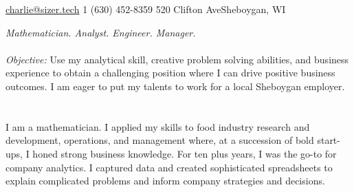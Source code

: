 \documentclass[10pt,letterpaper]{article} %
\begin{document}
 



\noindent\href{mailto:charlie@sizer.tech}{charlie@sizer.tech}\bull %
\textsmaller{+}1 (630) 452-8359\bull %
520 Clifton Ave\bull Sheboygan, WI%

\spacedhrule{0.9em}{-0.4em} %



\vspace{-1.3em} %

\begin{multicols}{2}  %
\noindent \textit{Mathematician. Analyst. Engineer. Manager.}\\\\
\emph{Objective: }Use my analytical skill, creative problem solving abilities, and business experience to obtain a challenging position where I can drive positive business outcomes. I am eager to put my talents to work for a local Sheboygan employer.\\
\\\\
\noindent 
I am a mathematician. I applied my skills to food industry research and development, operations, and management where, at a succession of bold start-ups, I honed strong business knowledge. For ten plus years, I was the go-to for company analytics. I captured data and created sophisticated spreadsheets to explain complicated problems and inform company strategies and decisions.

\end{multicols}
\end{document}
